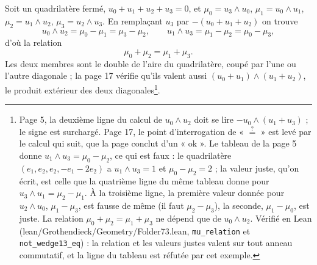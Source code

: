 \documentclass[11pt,a4paper]{article}
\begin{document}
Soit un quadrilatère fermé, $u_0 + u_1 + u_2 + u_3 = 0$, et
$\mu_0 = u_3 \wedge u_0$, $\mu_1 = u_0 \wedge u_1$, $\mu_2 = u_1 \wedge u_2$,
$\mu_3 = u_2 \wedge u_3$. En remplaçant $u_3$ par $-(u_0 + u_1 + u_2)$ on
trouve
\[
  u_0 \wedge u_2 = \mu_0 - \mu_1 = \mu_3 - \mu_2 ,
  \qquad
  u_1 \wedge u_3 = \mu_1 - \mu_2 = \mu_0 - \mu_3 ,
\]
d'où la relation
\[
  \mu_0 + \mu_2 = \mu_1 + \mu_3 .
\]
Les deux membres sont le double de l'aire du quadrilatère, coupé par l'une ou
l'autre diagonale ; la page 17 vérifie qu'ils valent aussi
$(u_0 + u_1) \wedge (u_1 + u_2)$, le produit extérieur des deux
diagonales\footnote{Page 5, la deuxième ligne du calcul de $u_0 \wedge u_2$
doit se lire $-u_0 \wedge (u_1 + u_3)$ ; le signe est surchargé. Page 17, le
point d'interrogation de « $\overset{?}{=}$ » est levé par le calcul qui
suit, que la page conclut d'un « ok ». Le tableau de la page 5 donne
$u_1 \wedge u_3 = \mu_0 - \mu_2$, ce qui est faux : le quadrilatère
$(e_1, e_2, e_2, -e_1 - 2e_2)$ a $u_1 \wedge u_3 = 1$ et $\mu_0 - \mu_2 = 2$ ;
la valeur juste, qu'on écrit, est celle que la quatrième ligne du même tableau
donne pour $u_3 \wedge u_1 = \mu_2 - \mu_1$. À la troisième ligne, la première
valeur donnée pour $u_2 \wedge u_0$, $\mu_1 - \mu_3$, est fausse de même (il
faut $\mu_2 - \mu_3$), la seconde, $\mu_1 - \mu_0$, est juste. La relation
$\mu_0 + \mu_2 = \mu_1 + \mu_3$ ne dépend que de $u_0 \wedge u_2$. Vérifié en
Lean (lean/Grothendieck/Geometry/Folder73.lean, \texttt{mu\_relation} et
\texttt{not\_wedge13\_eq}) : la relation et les valeurs justes valent sur tout
anneau commutatif, et la ligne du tableau est réfutée par cet exemple.}.
\end{document}
